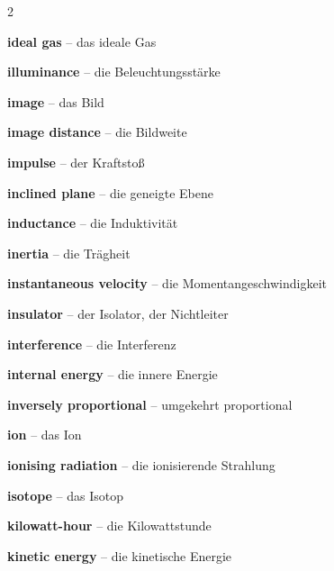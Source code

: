 \begin{multicols}{2}
\par\nopagebreak
\textbf{ideal gas} -- das ideale Gas\dotfill\hyperref[e:140]{\pageref*{e:140}}\par
\textbf{illuminance} -- die Beleuchtungsstärke\dotfill\hyperref[e:258]{\pageref*{e:258}}\par
\textbf{image} -- das Bild\dotfill\hyperref[e:249]{\pageref*{e:249}}\par
\textbf{image distance} -- die Bildweite\dotfill\hyperref[e:247]{\pageref*{e:247}}\par
\textbf{impulse} -- der Kraftstoß\dotfill\hyperref[e:80]{\pageref*{e:80}}\par
\textbf{inclined plane} -- die geneigte Ebene\dotfill\hyperref[e:85]{\pageref*{e:85}}\par
\textbf{inductance} -- die Induktivität\dotfill\hyperref[e:183]{\pageref*{e:183}}\par
\textbf{inertia} -- die Trägheit\dotfill\hyperref[e:76]{\pageref*{e:76}}\par
\textbf{instantaneous velocity} -- die Momentangeschwindigkeit\dotfill\hyperref[e:39]{\pageref*{e:39}}\par
\textbf{insulator} -- der Isolator, der Nichtleiter\dotfill\hyperref[e:151]{\pageref*{e:151}}\par
\textbf{interference} -- die Interferenz\dotfill\hyperref[e:209]{\pageref*{e:209}}\par
\textbf{internal energy} -- die innere Energie\dotfill\hyperref[e:118]{\pageref*{e:118}}\par
\textbf{inversely proportional} -- umgekehrt proportional\dotfill\hyperref[e:26]{\pageref*{e:26}}\par
\textbf{ion} -- das Ion\dotfill\hyperref[e:272]{\pageref*{e:272}}\par
\textbf{ionising radiation} -- die ionisierende Strahlung\dotfill\hyperref[e:278]{\pageref*{e:278}}\par
\textbf{isotope} -- das Isotop\dotfill\hyperref[e:271]{\pageref*{e:271}}\par

\par\nopagebreak
\textbf{kilowatt-hour} -- die Kilowattstunde\dotfill\hyperref[e:112]{\pageref*{e:112}}\par
\textbf{kinetic energy} -- die kinetische Energie\dotfill\hyperref[e:98]{\pageref*{e:98}}\par


\end{multicols}
